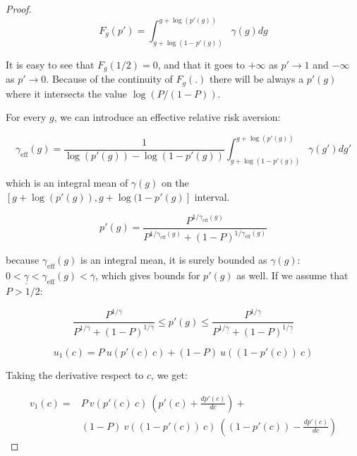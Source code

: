 \documentclass{article}
\theoremstyle{definition}
\begin{document}
\begin{proof}
    \begin{equation}
        F_g(p') = \int_{g+\log(1-p'(g))}^{g+\log(p'(g))} \gamma(g) dg
    \end{equation}

    It is easy to see that $F_g(1/2) =0$, and that it goes to $+\infty$ as $p' \to 1$ and $-\infty$ as $p' \to 0$. Because of the continuity of $F_g(.)$ there will be always a $p'(g)$ where it intersects the value $\log(P/(1-P))$.

    For every $g$, we can introduce an effective relative risk aversion:

    \begin{equation}
        \gamma_\mathrm{eff}(g) = \frac{1}{\log(p'(g)) - \log(1-p'(g))} \int_{g+\log(1-p'(g))}^{g+\log(p'(g))} \gamma(g') dg'
    \end{equation}
    

    which is an integral mean of $\gamma(g)$ on the $[g+\log(p'(g)), g+ \log(1-p'(g)]$ interval.

    \begin{equation}
        p'(g) = \frac{P^{1/\gamma_\mathrm{eff}(g)}}{P^{1/\gamma_\mathrm{eff}(g)} + (1-P)^{1/\gamma_\mathrm{eff}(g)}}
    \end{equation}

    because $\gamma_\mathrm{eff}(g)$ is an integral mean, it is surely bounded as $\gamma(g)$:
    $0 < \underline{\gamma} < \gamma_\mathrm{eff}(g) < \overline{\gamma}$, which gives bounds for $p'(g)$ as well. If we assume that $P>1/2$:

    \begin{equation}
        \frac{P^{1/\overline{\gamma}}}{P^{1/\overline{\gamma}} + (1-P)^{1/\overline{\gamma}}}
        \le 
        p'(g) 
        \le 
        \frac{P^{1/\underline{\gamma}}}{P^{1/\underline{\gamma}} + (1-P)^{1/\underline{\gamma}}}
    \end{equation}

    \begin{equation}
        u_1(c) = P \ u(p'(c) \ c) + (1-P) \ u((1-p'(c)) \ c)
    \end{equation}

    Taking the derivative respect to $c$, we get:

    \begin{equation}
        \begin{split}
            v_1(c) =& P \ v(p'(c) \ c) \ \left ( p'(c) + \frac{d p'(c)}{d c} \right ) + \\
                    &(1-P) \ v((1-p'(c)) \ c) \ \left ( (1-p'(c)) - \frac{d p'(c)}{d c} \right )
        \end{split}
    \end{equation} 


\end{proof}
\end{document}
